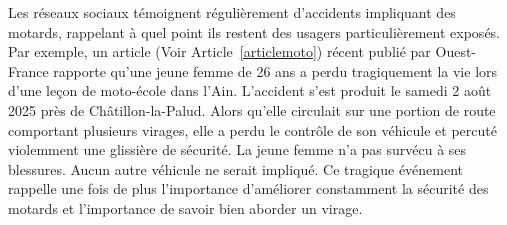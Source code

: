 Les réseaux sociaux témoignent régulièrement d’accidents impliquant des motards, rappelant à quel point ils restent des usagers particulièrement exposés. Par exemple, un article (Voir Article~\ref{articlemoto}) récent publié par Ouest-France rapporte qu'une jeune femme de 26 ans a perdu tragiquement la vie lors d'une leçon de moto-école dans l’Ain. L'accident s'est produit le samedi 2 août 2025 près de Châtillon-la-Palud. Alors qu'elle circulait sur une portion de route comportant plusieurs virages, elle a perdu le contrôle de son véhicule et percuté violemment une glissière de sécurité. La jeune femme n’a pas survécu à ses blessures. Aucun autre véhicule ne serait impliqué. Ce tragique événement rappelle une fois de plus l’importance d'améliorer constamment la sécurité des motards et l'importance de savoir bien aborder un virage.
\vspace{0.5cm}

